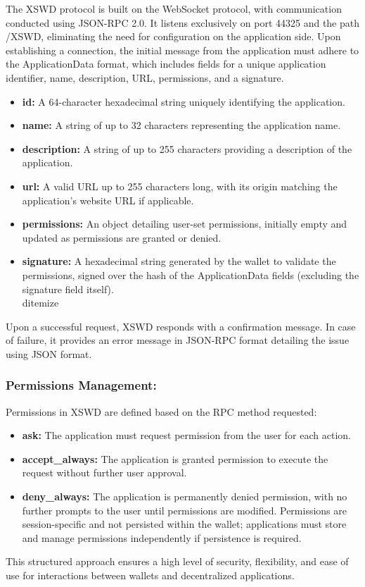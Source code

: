 \documentclass[10pt,a4paper,twocolumn]{article}
\begin{document}
The XSWD protocol is built on the WebSocket protocol, with communication conducted using JSON-RPC 2.0. It listens exclusively on port 44325 and the path /XSWD, eliminating the need for configuration on the application side. Upon establishing a connection, the initial message from the application must adhere to the ApplicationData format, which includes fields for a unique application identifier, name, description, URL, permissions, and a signature.\\
\begin{itemize}
  
\item \textbf{id:} A 64-character hexadecimal string uniquely identifying the application.
\item \textbf{name:} A string of up to 32 characters representing the application name.
\item \textbf{description:} A string of up to 255 characters providing a description of the application.
\item \textbf{url:} A valid URL up to 255 characters long, with its origin matching the application's website URL if applicable.
\item \textbf{permissions:} An object detailing user-set permissions, initially empty and updated as permissions are granted or denied.
\item \textbf{signature:} A hexadecimal string generated by the wallet to validate the permissions, signed over the hash of the ApplicationData fields (excluding the signature field itself).\\
d{itemize}
\end{itemize}
Upon a successful request, XSWD responds with a confirmation message. In case of failure, it provides an error message in JSON-RPC format detailing the issue using JSON format.\\

\subsubsection{Permissions Management:}

Permissions in XSWD are defined based on the RPC method requested:\\

\begin{itemize}
\item \textbf{ask:} The application must request permission from the user for each action.


\item \textbf{accept\_always:} The application is granted permission to execute the request without further user approval.

\item \textbf{deny\_always:} The application is permanently denied permission, with no further prompts to the user until permissions are modified.
Permissions are session-specific and not persisted within the wallet; applications must store and manage permissions independently if persistence is required.
\end{itemize}
This structured approach ensures a high level of security, flexibility, and ease of use for interactions between wallets and decentralized applications.
\end{document}
